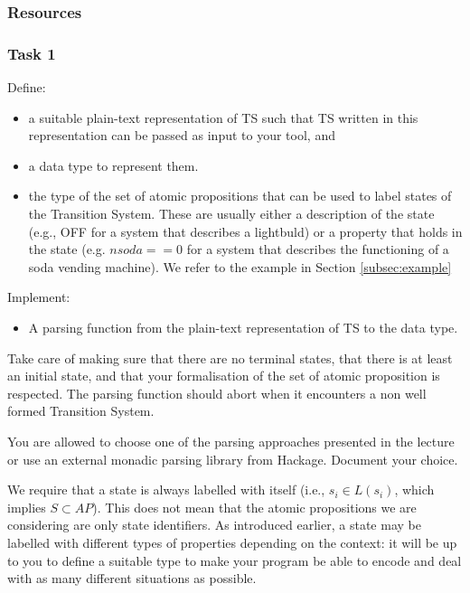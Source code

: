 \documentclass{article}
\begin{document}
\subsubsection*{Resources}
\cite[Paragraph 2.1]{BaKa}

\subsubsection*{Task 1}
Define:
\begin{itemize}
    \item a suitable plain-text representation of TS such that TS written in this representation
          can be passed as input to your tool, and
    \item a data type to represent them. 
    \item the type of the set of atomic propositions that can be used to label states of the Transition System.
        These are usually either a description of the state (e.g., OFF for a system that describes a lightbuld) 
        or a property that holds in the state (e.g. $nsoda == 0$ for a system that 
        describes the functioning of a soda vending machine). We refer to 
        the example in Section \ref{subsec:example}
\end{itemize} 
Implement: 
\begin{itemize}
    \item A parsing function from the plain-text representation of TS to the data type.
\end{itemize}
Take care of making sure that there are no terminal states, that there is at least an initial state, 
and that your formalisation of the set of atomic proposition is respected. The parsing function should 
abort when it encounters a non well formed Transition System.

You are allowed to choose one of the parsing approaches presented in the lecture or 
use an external monadic parsing library from Hackage. Document your choice.

We require that a state is always labelled with itself 
(i.e., $s_i \in L(s_i)$, which implies $S \subset AP$). This does not mean that the atomic propositions 
we are considering are only state identifiers. As introduced earlier, a state may be labelled with different 
types of properties depending on the context: it will be up to you to define a suitable type to make your 
program be able to encode and deal with as many different situations as possible.
\end{document}
